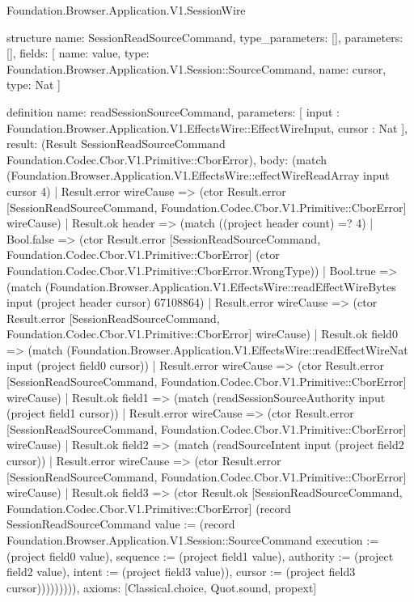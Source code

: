 \begin{lexlean}{Foundation.Browser.Application.V1.SessionWire}
\begin{semanticmodule}
structure{
  name: SessionReadSourceCommand,
  type_parameters: [],
  parameters: [],
  fields: [
    {name: value, type: Foundation.Browser.Application.V1.Session::SourceCommand},
    {name: cursor, type: Nat}
  ]
}

definition{
  name: readSessionSourceCommand,
  parameters: [
    input : Foundation.Browser.Application.V1.EffectsWire::EffectWireInput,
    cursor : Nat
  ],
  result: (Result SessionReadSourceCommand Foundation.Codec.Cbor.V1.Primitive::CborError),
  body: (match (Foundation.Browser.Application.V1.EffectsWire::effectWireReadArray input cursor 4)
    | Result.error wireCause => (ctor Result.error [SessionReadSourceCommand, Foundation.Codec.Cbor.V1.Primitive::CborError] wireCause)
    | Result.ok header => (match ((project header count) =? 4)
      | Bool.false => (ctor Result.error [SessionReadSourceCommand, Foundation.Codec.Cbor.V1.Primitive::CborError] (ctor Foundation.Codec.Cbor.V1.Primitive::CborError.WrongType))
      | Bool.true => (match (Foundation.Browser.Application.V1.EffectsWire::readEffectWireBytes input (project header cursor) 67108864)
        | Result.error wireCause => (ctor Result.error [SessionReadSourceCommand, Foundation.Codec.Cbor.V1.Primitive::CborError] wireCause)
        | Result.ok field0 => (match (Foundation.Browser.Application.V1.EffectsWire::readEffectWireNat input (project field0 cursor))
          | Result.error wireCause => (ctor Result.error [SessionReadSourceCommand, Foundation.Codec.Cbor.V1.Primitive::CborError] wireCause)
          | Result.ok field1 => (match (readSessionSourceAuthority input (project field1 cursor))
            | Result.error wireCause => (ctor Result.error [SessionReadSourceCommand, Foundation.Codec.Cbor.V1.Primitive::CborError] wireCause)
            | Result.ok field2 => (match (readSourceIntent input (project field2 cursor))
              | Result.error wireCause => (ctor Result.error [SessionReadSourceCommand, Foundation.Codec.Cbor.V1.Primitive::CborError] wireCause)
              | Result.ok field3 => (ctor Result.ok [SessionReadSourceCommand, Foundation.Codec.Cbor.V1.Primitive::CborError] (record SessionReadSourceCommand {value := (record Foundation.Browser.Application.V1.Session::SourceCommand {execution := (project field0 value), sequence := (project field1 value), authority := (project field2 value), intent := (project field3 value)}), cursor := (project field3 cursor)})))))))),
  axioms: [Classical.choice, Quot.sound, propext]
}


\end{semanticmodule}
\end{lexlean}
